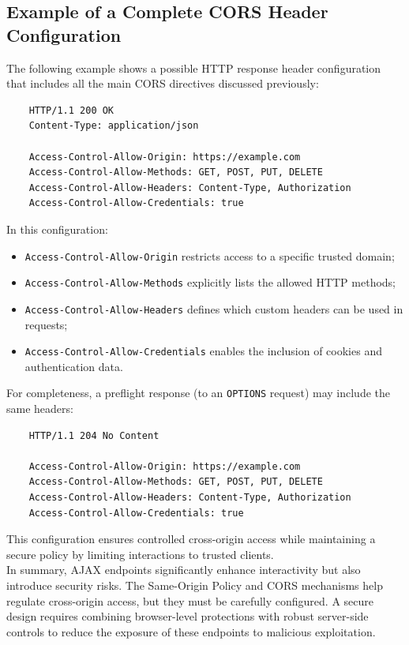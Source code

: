 \documentclass{scrbook}
\begin{document}
	\subsection{Example of a Complete CORS Header Configuration}
	
	The following example shows a possible HTTP response header configuration that includes all the main CORS directives discussed previously:
	
	\begin{lstlisting}
	HTTP/1.1 200 OK
	Content-Type: application/json
		
	Access-Control-Allow-Origin: https://example.com
	Access-Control-Allow-Methods: GET, POST, PUT, DELETE
	Access-Control-Allow-Headers: Content-Type, Authorization
	Access-Control-Allow-Credentials: true
	\end{lstlisting}
	
	In this configuration:
	
	\begin{itemize}
		\item \texttt{Access-Control-Allow-Origin} restricts access to a specific trusted domain;
		
		\item \texttt{Access-Control-Allow-Methods} explicitly lists the allowed HTTP methods;
		
		\item \texttt{Access-Control-Allow-Headers} defines which custom headers can be used in requests;
		
		\item \texttt{Access-Control-Allow-Credentials} enables the inclusion of cookies and authentication data.
	\end{itemize}
	
	For completeness, a preflight response (to an \texttt{OPTIONS} request) may include the same headers:
	
	\begin{lstlisting}
	HTTP/1.1 204 No Content
		
	Access-Control-Allow-Origin: https://example.com
	Access-Control-Allow-Methods: GET, POST, PUT, DELETE
	Access-Control-Allow-Headers: Content-Type, Authorization
	Access-Control-Allow-Credentials: true
	\end{lstlisting}
	
	This configuration ensures controlled cross-origin access while maintaining a secure policy by limiting interactions to trusted clients.\\
	
	In summary, AJAX endpoints significantly enhance interactivity but also introduce security risks. The Same-Origin Policy and CORS mechanisms help regulate cross-origin access, but they must be carefully configured. A secure design requires combining browser-level protections with robust server-side controls to reduce the exposure of these endpoints to malicious exploitation.
	
\end{document}
